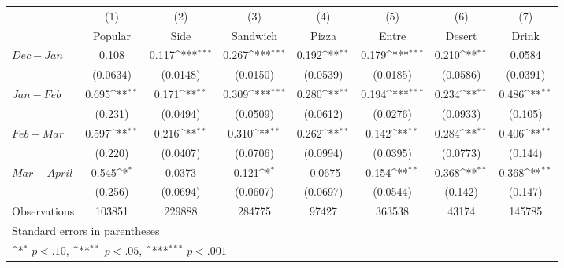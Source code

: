 {
\def\sym#1{\ifmmode^{#1}\else\(^{#1}\)\fi}
\begin{tabular}{l*{7}{c}}
\hline\hline
                    &\multicolumn{1}{c}{(1)}&\multicolumn{1}{c}{(2)}&\multicolumn{1}{c}{(3)}&\multicolumn{1}{c}{(4)}&\multicolumn{1}{c}{(5)}&\multicolumn{1}{c}{(6)}&\multicolumn{1}{c}{(7)}\\
                    &\multicolumn{1}{c}{Popular}&\multicolumn{1}{c}{Side}&\multicolumn{1}{c}{Sandwich}&\multicolumn{1}{c}{Pizza}&\multicolumn{1}{c}{Entre}&\multicolumn{1}{c}{Desert}&\multicolumn{1}{c}{Drink}\\
\hline
$ Dec-Jan $         &       0.108         &       0.117\sym{***}&       0.267\sym{***}&       0.192\sym{**} &       0.179\sym{***}&       0.210\sym{**} &      0.0584         \\
                    &    (0.0634)         &    (0.0148)         &    (0.0150)         &    (0.0539)         &    (0.0185)         &    (0.0586)         &    (0.0391)         \\
[1em]
 $ Jan-Feb $        &       0.695\sym{**} &       0.171\sym{**} &       0.309\sym{***}&       0.280\sym{**} &       0.194\sym{***}&       0.234\sym{**} &       0.486\sym{**} \\
                    &     (0.231)         &    (0.0494)         &    (0.0509)         &    (0.0612)         &    (0.0276)         &    (0.0933)         &     (0.105)         \\
[1em]
 $ Feb-Mar $        &       0.597\sym{**} &       0.216\sym{**} &       0.310\sym{**} &       0.262\sym{**} &       0.142\sym{**} &       0.284\sym{**} &       0.406\sym{**} \\
                    &     (0.220)         &    (0.0407)         &    (0.0706)         &    (0.0994)         &    (0.0395)         &    (0.0773)         &     (0.144)         \\
[1em]
 $ Mar-April $      &       0.545\sym{*}  &      0.0373         &       0.121\sym{*}  &     -0.0675         &       0.154\sym{**} &       0.368\sym{**} &       0.368\sym{**} \\
                    &     (0.256)         &    (0.0694)         &    (0.0607)         &    (0.0697)         &    (0.0544)         &     (0.142)         &     (0.147)         \\
\hline
Observations        &      103851         &      229888         &      284775         &       97427         &      363538         &       43174         &      145785         \\
\hline\hline
\multicolumn{8}{l}{\footnotesize Standard errors in parentheses}\\
\multicolumn{8}{l}{\footnotesize \sym{*} \(p<.10\), \sym{**} \(p<.05\), \sym{***} \(p<.001\)}\\
\end{tabular}
}
